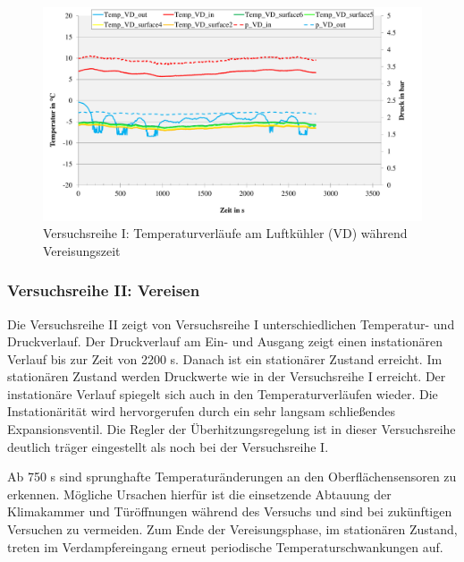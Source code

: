 \begin{figure}[htb]
\centering		\includegraphics[page=1,width=1.08\textwidth]{Pictures/Inbetriebnahme/Abtaumethoden_Tempverlaufe_Vereisen.pdf}
\caption{Versuchsreihe I: Temperaturverläufe am Luftkühler (VD) während Vereisungszeit}
\label{fig:VereisenI}
\end{figure}


\subsubsection*{Versuchsreihe II: Vereisen}

Die Versuchsreihe II zeigt von Versuchsreihe I unterschiedlichen Temperatur- und Druckverlauf. Der Druckverlauf am Ein- und Ausgang zeigt einen instationären Verlauf bis zur Zeit von 2200 s. Danach ist ein stationärer Zustand erreicht. Im stationären Zustand werden Druckwerte wie in der Versuchsreihe I erreicht. Der instationäre Verlauf spiegelt sich auch in den Temperaturverläufen wieder. Die Instationärität wird hervorgerufen durch ein sehr langsam schließendes Expansionsventil. Die Regler der Überhitzungsregelung ist in dieser Versuchsreihe deutlich träger eingestellt als noch bei der Versuchsreihe I. 

Ab 750 s sind sprunghafte Temperaturänderungen an den Oberflächensensoren zu erkennen. Mögliche Ursachen hierfür ist die einsetzende Abtauung der Klimakammer und Türöffnungen während des Versuchs und sind bei zukünftigen Versuchen zu vermeiden. Zum Ende der Vereisungsphase, im stationären Zustand, treten im Verdampfereingang erneut periodische Temperaturschwankungen auf. 

